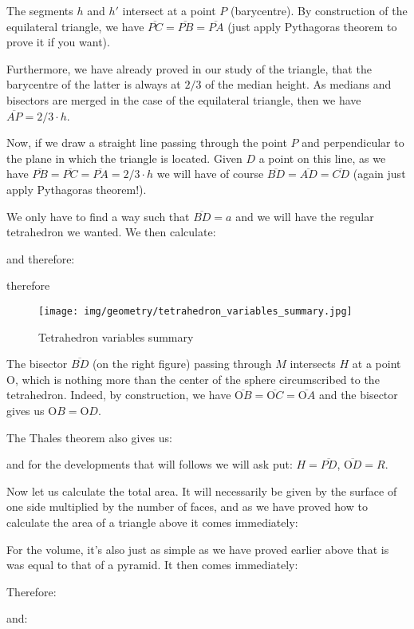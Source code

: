 {	The segments $h$ and $h'$ intersect at a point $P$ (barycentre). By construction of the equilateral triangle, we have $\overline{PC}=\overline{PB}=\overline{PA}$ (just apply Pythagoras theorem to prove it if you want).
	
	Furthermore, we have already proved in our study of the triangle, that the barycentre of the latter is always at $2/3$ of the median height. As medians and bisectors are merged in the case of the equilateral triangle, then we have $\overline{AP}=2/3 \cdot h$.
	
	Now, if we draw a straight line passing through the point $P$ and perpendicular to the plane in which the triangle is located. Given $D$ a point on this line, as we have $\overline{PB}=\overline{PC}=\overline{PA}=2/3\cdot h$ we will have of course $\overline{BD}=\overline{AD}=\overline{CD}$ (again just apply Pythagoras theorem!).
	
	We only have to find a way such that $\overline{BD}=a$ and we will have the regular tetrahedron we wanted. We then calculate:
	
	and therefore:
	
	therefore
	
	\begin{figure}[H]
		\centering
		\texttt{[image: img/geometry/tetrahedron\_variables\_summary.jpg]}
		\caption[]{Tetrahedron variables summary}
	\end{figure}
	The bisector $\overline{BD}$ (on the right figure) passing through $M$ intersects $H$ at a point O, which is nothing more than the center of the sphere circumscribed to the tetrahedron. Indeed, by construction, we have $\overline{\text{O}B}=\overline{\text{O}C}=\overline{\text{O}A}$ and the bisector gives us $\text{O}B=\text{O}D$.
	
	The Thales theorem also gives us:
	
	and for the developments that will follows we will ask put: $H=\overline{PD}$, $\overline{\text{O}D}=R$.
	
	Now let us calculate the total area. It will necessarily be given by the surface of one side multiplied by the number of faces, and as we have proved how to calculate the area of a triangle above it comes immediately:
	
	For the volume, it's also just as simple as we have proved earlier above that is was equal to that of a pyramid. It then comes immediately:
	
	Therefore:
	
	and:
	
}

